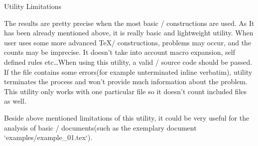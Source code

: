 \sec Utility Limitations

The results are pretty precise when the most basic \OpTeX/ constructions are used.
As It has been already mentioned above, it is really basic and lightweight utility.
When user uses some more advanced \TeX/ constructions, problems may occur, and the counts may be imprecise.
It doesn't take into account macro expansion, self defined rules etc\dots When using this utility, a valid \OpTeX/ source code should be passed.
If the file contains some errors(for example unterminated inline verbatim), utility terminates the process and won't provide much information about the problem.
This utility only works with one particular file so it doesn't count included files as well.

Beside above mentioned limitations of this utility, it could be very useful for the analysis of basic \OpTeX/ documents(such as the exemplary document {\Blue `examples/example_01.tex`}).

\bye

